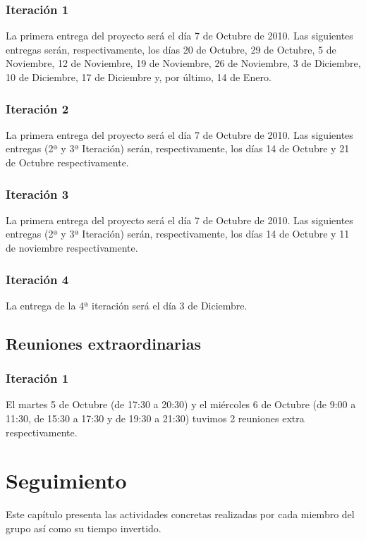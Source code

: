 \documentclass[11 pt]{book}
\begin{document}
        \subsection*{Iteración 1}
            La primera entrega del proyecto será el día 7 de Octubre de 2010. Las siguientes entregas serán, respectivamente, los días 20 de Octubre, 29 de Octubre, 5 de Noviembre, 12 de Noviembre, 19 de Noviembre, 26 de Noviembre, 3 de Diciembre, 10 de Diciembre, 17 de Diciembre y, por último, 14 de Enero.
            
        \subsection*{Iteración 2}
            La primera entrega del proyecto será el día 7 de Octubre de 2010. Las siguientes entregas (2ª y 3ª Iteración) serán, respectivamente, los días 14 de Octubre y 21 de Octubre respectivamente.
            
        \subsection*{Iteración 3}
	        La primera entrega del proyecto será el día 7 de Octubre de 2010. Las siguientes entregas (2ª y 3ª Iteración) serán, respectivamente, los días 14 de Octubre y 11 de noviembre respectivamente.

		\subsection*{Iteración 4}
			La entrega de la 4ª iteración será el día 3 de Diciembre.
			
	\section{Reuniones extraordinarias}
	    \subsection*{Iteración 1}
		    El martes 5 de Octubre (de 17:30 a 20:30) y el miércoles 6 de Octubre (de 9:00 a 11:30, de 15:30 a 17:30 y de 19:30 a 21:30) tuvimos 2 reuniones extra respectivamente.

\chapter{Seguimiento}
	Este capítulo presenta las actividades concretas realizadas por cada miembro del grupo así como su tiempo invertido.
	
\end{document}
